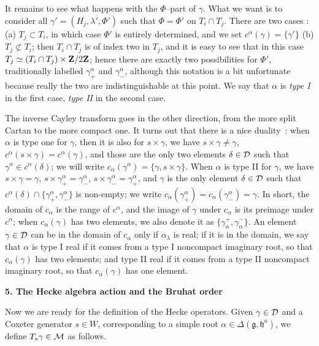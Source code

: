 \documentclass[11 pt]{article}
\def\a{\alpha}
\def\D{{\cal D}}
\def\d{\delta}
\def\F{\Phi}
\def\g{\gamma}
\def\gf{{\mathfrak g}}
\def\hf{{\mathfrak h}}
\def\l{\lambda}
\def\M{{\cal M}}
\def\Z{{\bf Z}}
\begin{document}
It remains to see what happens with the $\F$--part of $\g$. What we want is
to consider all $\g'=(H_j,\l',\F')$ such that $\F=\F'$ on $T_i\cap T_j$. There
are
two cases : (a) $T_j\subset T_i$, in which case $\F'$ is entirely determined,
and we set $c^\a(\g)=\{\g'\}$ (b) $T_j\not\subset T_i$; then $T_i\cap T_j$ is
of index two in $T_j$, and it is easy to see that in this case
$T_j\simeq(T_i\cap T_j)\times\Z/2\Z$; hence there are exactly two possibilities
for $\F'$, traditionally labelled $\g^\a_+$ and $\g^\a_-$, although this
notation is a bit unfortunate because really the two are indistinguishable
at this point. We say that $\a$ is {\em type I} in the first case, {\em type
II} in the second case.

The inverse Cayley transform goes in the other direction, from the more
split Cartan to the more compact one. It turns out that there is a nice
duality~: when $\a$ is type one for $\g$, then it is also for $s\times\g$,
we have $s\times\g\neq\g$,
$c^\a(s\times\g)=c^\a(\g)$, and those are the only two elements $\d\in\D$
such that $\g^\a\in c^\a(\d)$; we will write $c_\a(\g^\a)=\{\g,s\times\g\}$.
When $\a$ is type II for $\g$, we have $s\times\g=\g$,
$s\times\g^\a_+=\g^\a_-$, $s\times\g^\a_-=\g^\a_+$, and $\g$ is the only
element $\d\in\D$ such that $c^\a(\d)\cap\{\g^\a_+,\g^\a_-\}$ is non-empty;
we write $c_\a(\g^\a_+)=c_\a(\g^\a_-)=\g$. In short, the domain of $c_\a$ is
the range of $c^\a$, and the image of $\g$ under $c_\a$ is its preimage
under $c^\a$; when $c_\a(\g)$ has two elements, we also denote it as
$\{\g^+_\a,\g^-_\a\}$. An element $\g\in\D$ can be in the domain of $c_\a$
only if $\a_\l$ is real; if it is in the domain, we say that $\a$ is type I
real if it comes from a type I noncompact imaginary root, so that
$c_\a(\g)$ has two elements; and type II real if it comes from a type II
noncompact imaginary root, so that $c_\a(\g)$ has one element.

\bigskip

\noindent\textbf{5. The Hecke algebra action and the Bruhat order}

\medskip

Now we are ready for the definition of the Hecke operators. Given $\g\in\D$
and a Coxeter generator $s\in W$, corresponding to a simple root
$\a\in\Delta(\gf,\hf^a)$, we define $T_s\g\in \M$ as follows.
\end{document}

